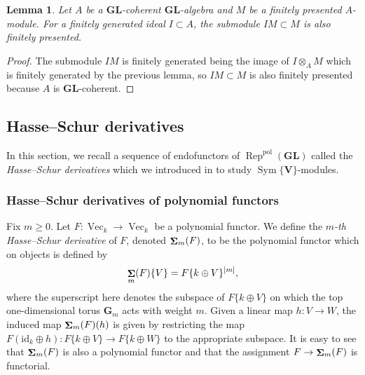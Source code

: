 \documentclass[12pt]{amsart}
\newcommand{\rD}{\mathrm{D}}
\newcommand{\bG}{\mathbf{G}}
\newcommand{\bV}{\mathbf{V}}
\DeclareMathOperator{\Sym}{Sym}
\DeclareMathOperator{\Mod}{Mod}
\newcommand{\id}{\mathrm{id}}
\newcommand{\pol}{\mathrm{pol}}
\DeclareMathOperator{\Sh}{\bf{\Sigma}}
\DeclareMathOperator{\Rep}{Rep}
\DeclareMathOperator{\Fec}{Vec}
\DeclareMathOperator{\fgen}{fg}
\DeclareMathOperator{\fpre}{fp}
\newcommand{\GL}{\mathbf{GL}}
\numberwithin{equation}{section}
\newtheorem{lemma}[equation]{Lemma}
\theoremstyle{definition}
\theoremstyle{plain}
\begin{document}
\begin{lemma}\label{lem:IMfp}
    Let $A$ be a $\GL$-coherent $\GL$-algebra and $M$ be a finitely presented $A$-module. For a finitely generated ideal $I \subset A$, the submodule $IM \subset M$ is also finitely presented.
\end{lemma}
\begin{proof}
   The submodule $IM$ is finitely generated being the image of $I \otimes_A M$ which is finitely generated by the previous lemma, so $IM \subset M$ is also finitely presented because $A$ is  $\GL$-coherent.
\end{proof}


\subsection{Hasse--Schur derivatives}\label{ss:hasseschur} 
In this section, we recall a sequence of endofunctors of $\Rep^\pol(\GL)$ called the \textit{Hasse--Schur derivatives} which we introduced in \cite{gan25pol} to study $\Sym\{\bV\}$-modules. 

\subsubsection{Hasse--Schur derivatives of polynomial functors} Fix $m \geq 0$. Let $F \colon \Fec_k \to \Fec_k$ be a polynomial functor. We define the \textit{$m$-th Hasse--Schur derivative} of $F$, denoted $\Sh_m(F)$, to be the polynomial functor which on objects is defined by
\begin{displaymath}
\Sh_m(F)\{V\} = F\{k \oplus V\}^{[m]},
\end{displaymath}
where the superscript here denotes the subspace of $F\{k \oplus V\}$ on which the top one-dimensional torus $\bG_m$ acts with weight $m$. Given a linear map $h \colon V \to W$, the induced map $\Sh_m(F)(h)$ is given by restricting the map $F(\id_k \oplus h) \colon F\{k \oplus V\} \to F\{k \oplus W\}$ to the appropriate subspace. It is easy to see that $\Sh_m(F)$ is also a polynomial functor and that the assignment $F \to \Sh_m(F)$ is functorial. 
\end{document}
